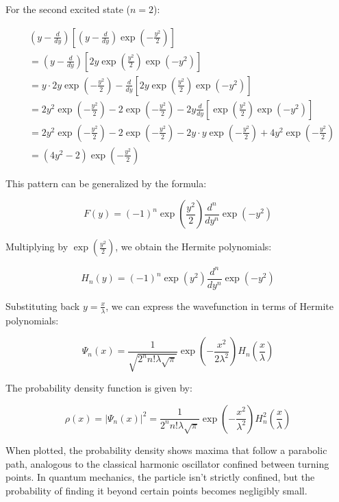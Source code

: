\documentclass[10pt]{article}
\begin{document}
For the second excited state ($n=2$):

\begin{align*}
&\left(y-\frac{d}{dy}\right)\left[\left(y-\frac{d}{dy}\right)\exp\left(-\frac{y^2}{2}\right)\right] \\
&= \left(y-\frac{d}{dy}\right)\left[2y\exp\left(\frac{y^2}{2}\right)\exp(-y^2)\right] \\
&= y\cdot 2y\exp\left(-\frac{y^2}{2}\right) - \frac{d}{dy}\left[2y\exp\left(\frac{y^2}{2}\right)\exp(-y^2)\right] \tag{5.50} \\
&= 2y^2\exp\left(-\frac{y^2}{2}\right) - 2\exp\left(-\frac{y^2}{2}\right) - 2y\frac{d}{dy}\left[\exp\left(\frac{y^2}{2}\right)\exp(-y^2)\right] \\
&= 2y^2\exp\left(-\frac{y^2}{2}\right) - 2\exp\left(-\frac{y^2}{2}\right) - 2y\cdot y\exp\left(-\frac{y^2}{2}\right) + 4y^2\exp\left(-\frac{y^2}{2}\right) \\
&= (4y^2-2)\exp\left(-\frac{y^2}{2}\right)
\end{align*}

This pattern can be generalized by the formula:

\begin{equation*}
F(y) = (-1)^n\exp\left(\frac{y^2}{2}\right)\frac{d^n}{dy^n}\exp(-y^2) \tag{5.51}
\end{equation*}

Multiplying by $\exp\left(\frac{y^2}{2}\right)$, we obtain the Hermite polynomials:

\begin{equation*}
H_n(y) = (-1)^n\exp(y^2)\frac{d^n}{dy^n}\exp(-y^2) \tag{5.52}
\end{equation*}

Substituting back $y=\frac{x}{\lambda}$, we can express the wavefunction in terms of Hermite polynomials:

\begin{equation*}
\Psi_n(x) = \frac{1}{\sqrt{2^n n!\lambda\sqrt{\pi}}}\exp\left(-\frac{x^2}{2\lambda^2}\right)H_n\left(\frac{x}{\lambda}\right) \tag{5.53}
\end{equation*}

The probability density function is given by:

\begin{equation*}
\rho(x) = |\Psi_n(x)|^2 = \frac{1}{2^n n!\lambda\sqrt{\pi}}\exp\left(-\frac{x^2}{\lambda^2}\right)H_n^2\left(\frac{x}{\lambda}\right) \tag{5.54}
\end{equation*}

When plotted, the probability density shows maxima that follow a parabolic path, analogous to the classical harmonic oscillator confined between turning points. In quantum mechanics, the particle isn't strictly confined, but the probability of finding it beyond certain points becomes negligibly small.
\end{document}
